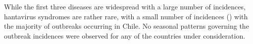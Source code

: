 \documentclass[twoside,leqno,twocolumn]{article}
\begin{document}
While the first three diseases are widespread with a large number of incidences, hantavirus syndromes are rather rare, with a small number of incidences () with the majority of outbreaks occurring in Chile. No seasonal patterns governing the outbreak incidences were observed for any of the countries under consideration.

\end{document}
